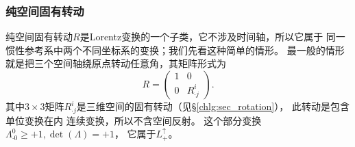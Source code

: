 \subsubsection{纯空间固有转动} %
纯空间固有转动$R$是Lorentz变换的一个子类，它不涉及时间轴，所以它属于
同一惯性参考系中两个不同坐标系的变换；我们先看这种简单的情形。
最一般的情形就是把三个空间轴绕原点转动任意角，其矩阵形式为
\begin{equation} \label{chlg:eqn_rotation-4d}
    R = \begin{pmatrix}
        1    & 0  \\
        0 & R^i_{\cdot j}  
    \end{pmatrix} .
\end{equation}
其中$3\times 3$矩阵$R^i_{\cdot j}$是三维空间的固有转动（见\S\ref{chlg:sec_rotation}），
此转动是包含单位变换在内
连续变换，所以不含空间反射。 这个部分变换
$\Lambda^{0}_{\cdot 0}\geqslant +1, \det(\Lambda)=+1$，
它属于$L^{\uparrow}_{+}$。




